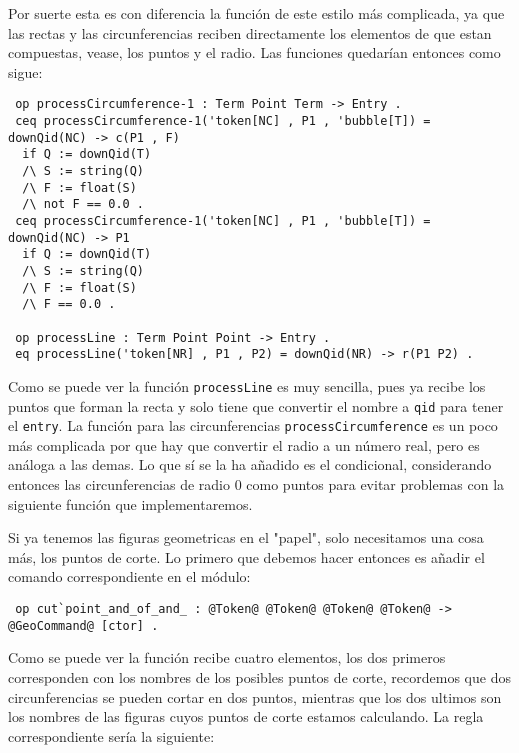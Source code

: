 Por suerte esta es con diferencia la función de este estilo más complicada, ya que las rectas y las circunferencias reciben directamente los elementos de que estan compuestas, vease, los puntos y el radio. Las funciones quedarían entonces como sigue:\par

{\codesize
\begin{verbatim}
 op processCircumference-1 : Term Point Term -> Entry .
 ceq processCircumference-1('token[NC] , P1 , 'bubble[T]) = downQid(NC) -> c(P1 , F)
  if Q := downQid(T)
  /\ S := string(Q)
  /\ F := float(S)
  /\ not F == 0.0 .
 ceq processCircumference-1('token[NC] , P1 , 'bubble[T]) = downQid(NC) -> P1
  if Q := downQid(T)
  /\ S := string(Q)
  /\ F := float(S)
  /\ F == 0.0 .

 op processLine : Term Point Point -> Entry .
 eq processLine('token[NR] , P1 , P2) = downQid(NR) -> r(P1 P2) .
\end{verbatim}
}

Como se puede ver la función \texttt{processLine} es muy sencilla, pues ya recibe los puntos que forman la recta y solo tiene que convertir el nombre a \texttt{qid} para tener el \texttt{entry}. La función para las circunferencias \texttt{processCircumference} es un poco más complicada por que hay que convertir el radio a un número real, pero es análoga a las demas. Lo que sí se la ha añadido es el condicional, considerando entonces las circunferencias de radio 0 como puntos para evitar problemas con la siguiente función que implementaremos.\par

Si ya tenemos las figuras geometricas en el "papel", solo necesitamos una cosa más, los puntos de corte. Lo primero que debemos hacer entonces es añadir el comando correspondiente en el módulo: \par

{\codesize
\begin{verbatim}
 op cut`point_and_of_and_ : @Token@ @Token@ @Token@ @Token@ -> @GeoCommand@ [ctor] .
\end{verbatim}
}

Como se puede ver la función recibe cuatro elementos, los dos primeros corresponden con los nombres de los posibles puntos de corte, recordemos que dos circunferencias se pueden cortar en dos puntos, mientras que los dos ultimos son los nombres de las figuras cuyos puntos de corte estamos calculando. La regla correspondiente sería la siguiente: \par
 
